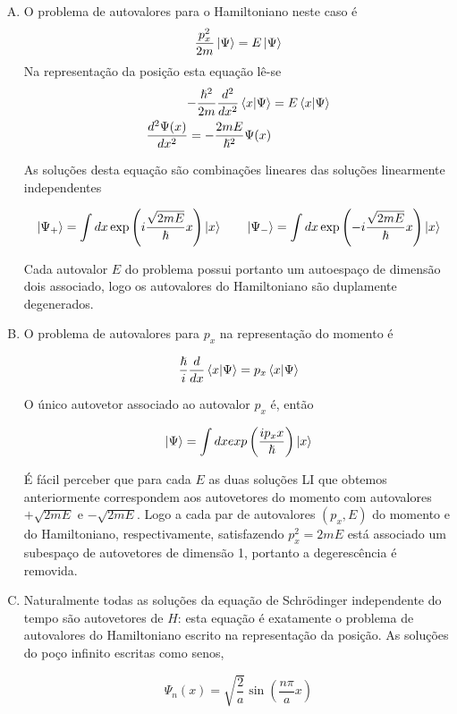 \documentclass[a4paper, 12pt, notitlepage]{article}
\begin{document}
\begin{enumerate}
\begin{enumerate}[(A)]
  \item O problema de autovalores para o Hamiltoniano neste caso é
  \[
    \frac{p_x^2}{2m} \ket{\Psi} = E\ket{\Psi}
  \]
  Na representação da posição esta equação lê-se
  \begin{align*}
    -\frac{\hslash^2}{2m} \frac{d^2}{dx^2} \bra{x}\ket{\Psi} &= E \bra{x} \ket{\Psi} \\
    \frac{d^2\Psi(x)}{dx^2} = -\frac{2mE}{\hslash^2} \Psi(x)
  \end{align*}
  
  As soluções desta equação são combinações lineares das soluções linearmente independentes
  
  \begin{equation*}
    \ket{\Psi_+} =  \int dx \exp\left(i\frac{\sqrt{2mE}}{\hslash}x\right) \ket{x} \qquad \ket{\Psi_-} =  \int dx \exp\left(-i\frac{\sqrt{2mE}}{\hslash}x\right)\ket{x} 
  \end{equation*}
  
  Cada autovalor $E$ do problema possui portanto um autoespaço de dimensão dois associado, logo os autovalores do Hamiltoniano são duplamente degenerados.
  
  \item O problema de autovalores para $p_x$ na representação do momento é
  
  \[
    \frac{\hslash}{i} \frac{d}{dx} \bra{x}\ket{\Psi} = p_x \bra{x}\ket{\Psi}
  \]
  
  O único autovetor associado ao autovalor $p_x$ é, então
  
  \[
    \ket{\Psi} = \int dx exp\left(\frac{ip_x x}{\hslash}\right) \ket{x}
  \]
  
  É fácil perceber que para cada $E$ as duas soluções LI que obtemos anteriormente correspondem aos autovetores do momento com autovalores $+\sqrt{2mE}$ e $-\sqrt{2mE}$. Logo a cada par de autovalores $(p_x, E)$ do momento e do Hamiltoniano, respectivamente, satisfazendo $p_x^2 = 2mE$ está associado um subespaço de autovetores de dimensão 1, portanto a degerescência é removida.
  
  \item Naturalmente todas as soluções da equação de Schrödinger independente do tempo são autovetores de $H$: esta equação é exatamente o problema de autovalores do Hamiltoniano escrito na representação da posição. As soluções do poço infinito escritas como senos,
  
  \[
    \Psi_n(x) = \sqrt{\frac{2}{a}} \sin\left(\frac{n\pi}{a}x\right)
  \]
  

\end{enumerate}
\end{enumerate}
\end{document}

